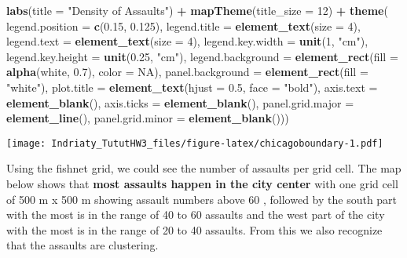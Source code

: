 \documentclass[
]{article}
\newenvironment{Shaded}{\begin{snugshade}}{\end{snugshade}}
\newcommand{\AttributeTok}[1]{\textcolor[rgb]{0.13,0.29,0.53}{#1}}
\newcommand{\ConstantTok}[1]{\textcolor[rgb]{0.56,0.35,0.01}{#1}}
\newcommand{\DecValTok}[1]{\textcolor[rgb]{0.00,0.00,0.81}{#1}}
\newcommand{\FloatTok}[1]{\textcolor[rgb]{0.00,0.00,0.81}{#1}}
\newcommand{\FunctionTok}[1]{\textcolor[rgb]{0.13,0.29,0.53}{\textbf{#1}}}
\newcommand{\NormalTok}[1]{#1}
\newcommand{\SpecialCharTok}[1]{\textcolor[rgb]{0.81,0.36,0.00}{\textbf{#1}}}
\newcommand{\StringTok}[1]{\textcolor[rgb]{0.31,0.60,0.02}{#1}}
\begin{document}
\begin{Shaded}
\begin{Highlighting}[]
    \FunctionTok{labs}\NormalTok{(}\AttributeTok{title =} \StringTok{"Density of Assaults"}\NormalTok{) }\SpecialCharTok{+}
    \FunctionTok{mapTheme}\NormalTok{(}\AttributeTok{title\_size =} \DecValTok{12}\NormalTok{) }\SpecialCharTok{+}
    \FunctionTok{theme}\NormalTok{(}
      \AttributeTok{legend.position =} \FunctionTok{c}\NormalTok{(}\FloatTok{0.15}\NormalTok{, }\FloatTok{0.125}\NormalTok{),}
      \AttributeTok{legend.title =} \FunctionTok{element\_text}\NormalTok{(}\AttributeTok{size =} \DecValTok{4}\NormalTok{),}
      \AttributeTok{legend.text =} \FunctionTok{element\_text}\NormalTok{(}\AttributeTok{size =} \DecValTok{4}\NormalTok{),}
      \AttributeTok{legend.key.width =} \FunctionTok{unit}\NormalTok{(}\DecValTok{1}\NormalTok{, }\StringTok{"cm"}\NormalTok{),}
      \AttributeTok{legend.key.height =} \FunctionTok{unit}\NormalTok{(}\FloatTok{0.25}\NormalTok{, }\StringTok{"cm"}\NormalTok{),}
      \AttributeTok{legend.background =} \FunctionTok{element\_rect}\NormalTok{(}\AttributeTok{fill =} \FunctionTok{alpha}\NormalTok{(}\StringTok{\textquotesingle{}white\textquotesingle{}}\NormalTok{, }\FloatTok{0.7}\NormalTok{), }\AttributeTok{color =} \ConstantTok{NA}\NormalTok{),}
      \AttributeTok{panel.background =} \FunctionTok{element\_rect}\NormalTok{(}\AttributeTok{fill =} \StringTok{"white"}\NormalTok{),}
      \AttributeTok{plot.title =} \FunctionTok{element\_text}\NormalTok{(}\AttributeTok{hjust =} \FloatTok{0.5}\NormalTok{, }\AttributeTok{face =} \StringTok{"bold"}\NormalTok{),}
      \AttributeTok{axis.text =} \FunctionTok{element\_blank}\NormalTok{(),}
      \AttributeTok{axis.ticks =} \FunctionTok{element\_blank}\NormalTok{(),}
      \AttributeTok{panel.grid.major =} \FunctionTok{element\_line}\NormalTok{(),}
      \AttributeTok{panel.grid.minor =} \FunctionTok{element\_blank}\NormalTok{()))}
\end{Highlighting}
\end{Shaded}

\texttt{[image: Indriaty\_TututHW3\_files/figure-latex/chicagoboundary-1.pdf]}

Using the fishnet grid, we could see the number of assaults per grid
cell. The map below shows that \textbf{most assaults happen in the city
center} with one grid cell of 500 m x 500 m showing assault numbers
above 60 , followed by the south part with the most is in the range of
40 to 60 assaults and the west part of the city with the most is in the
range of 20 to 40 assaults. From this we also recognize that the
assaults are clustering.
\end{document}
